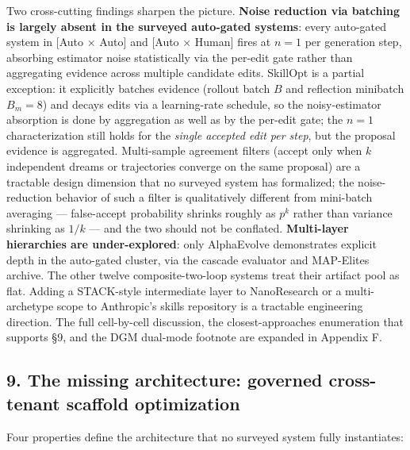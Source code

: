 \documentclass[
]{article}
\begin{document}
Two cross-cutting findings sharpen the picture. \textbf{Noise reduction
via batching is largely absent in the surveyed auto-gated systems}:
every auto-gated system in {[}Auto × Auto{]} and {[}Auto × Human{]}
fires at \(n = 1\) per generation step, absorbing estimator noise
statistically via the per-edit gate rather than aggregating evidence
across multiple candidate edits. SkillOpt is a partial exception: it
explicitly batches evidence (rollout batch \(B\) and reflection
minibatch \(B_m{=}8\)) and decays edits via a learning-rate schedule, so
the noisy-estimator absorption is done by aggregation as well as by the
per-edit gate; the \(n{=}1\) characterization still holds for the
\emph{single accepted edit per step}, but the proposal evidence is
aggregated. Multi-sample agreement filters (accept only when \(k\)
independent dreams or trajectories converge on the same proposal) are a
tractable design dimension that no surveyed system has formalized; the
noise-reduction behavior of such a filter is qualitatively different
from mini-batch averaging --- false-accept probability shrinks roughly
as \(p^k\) rather than variance shrinking as \(1/k\) --- and the two
should not be conflated. \textbf{Multi-layer hierarchies are
under-explored}: only AlphaEvolve demonstrates explicit depth in the
auto-gated cluster, via the cascade evaluator and MAP-Elites archive.
The other twelve composite-two-loop systems treat their artifact pool as
flat. Adding a STACK-style intermediate layer to NanoResearch or a
multi-archetype scope to Anthropic's skills repository is a tractable
engineering direction. The full cell-by-cell discussion, the
closest-approaches enumeration that supports §9, and the DGM dual-mode
footnote are expanded in Appendix F.

\subsection{9. The missing architecture: governed cross-tenant scaffold
optimization}\label{the-missing-architecture-governed-cross-tenant-scaffold-optimization}

Four properties define the architecture that no surveyed system fully
instantiates:
\end{document}
